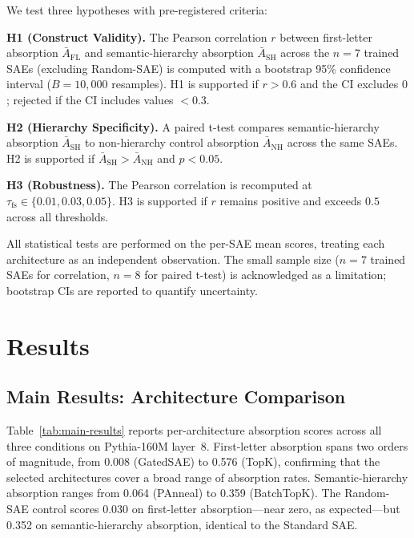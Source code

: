 \documentclass{article}
\begin{document}
We test three hypotheses with pre-registered criteria:

\textbf{H1 (Construct Validity).} The Pearson correlation $r$ between first-letter absorption $\bar{A}_{\text{FL}}$ and semantic-hierarchy absorption $\bar{A}_{\text{SH}}$ across the $n = 7$ trained SAEs (excluding Random-SAE) is computed with a bootstrap 95\% confidence interval ($B = 10{,}000$ resamples). H1 is supported if $r > 0.6$ and the CI excludes $0$; rejected if the CI includes values $< 0.3$.

\textbf{H2 (Hierarchy Specificity).} A paired t-test compares semantic-hierarchy absorption $\bar{A}_{\text{SH}}$ to non-hierarchy control absorption $\bar{A}_{\text{NH}}$ across the same SAEs. H2 is supported if $\bar{A}_{\text{SH}} > \bar{A}_{\text{NH}}$ and $p < 0.05$.

\textbf{H3 (Robustness).} The Pearson correlation is recomputed at $\tau_{\text{fs}} \in \{0.01, 0.03, 0.05\}$. H3 is supported if $r$ remains positive and exceeds $0.5$ across all thresholds.

All statistical tests are performed on the per-SAE mean scores, treating each architecture as an independent observation. The small sample size ($n = 7$ trained SAEs for correlation, $n = 8$ for paired t-test) is acknowledged as a limitation; bootstrap CIs are reported to quantify uncertainty.

\section{Results}
\label{sec:results}

\subsection{Main Results: Architecture Comparison}

Table~\ref{tab:main-results} reports per-architecture absorption scores across all three conditions on Pythia-160M layer~8. First-letter absorption spans two orders of magnitude, from 0.008 (GatedSAE) to 0.576 (TopK), confirming that the selected architectures cover a broad range of absorption rates. Semantic-hierarchy absorption ranges from 0.064 (PAnneal) to 0.359 (BatchTopK). The Random-SAE control scores 0.030 on first-letter absorption---near zero, as expected---but 0.352 on semantic-hierarchy absorption, identical to the Standard SAE.
\end{document}
